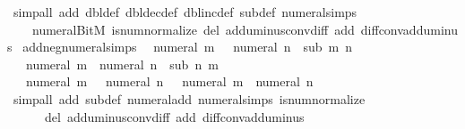 \begin{isabellebody}
\ {\isacharparenleft}{\kern0pt}simp{\isacharunderscore}{\kern0pt}all\ add{\isacharcolon}{\kern0pt}\ dbl{\isacharunderscore}{\kern0pt}def\ dbl{\isacharunderscore}{\kern0pt}dec{\isacharunderscore}{\kern0pt}def\ dbl{\isacharunderscore}{\kern0pt}inc{\isacharunderscore}{\kern0pt}def\ sub{\isacharunderscore}{\kern0pt}def\ numeral{\isachardot}{\kern0pt}simps\isanewline
\ \ \ \ numeral{\isacharunderscore}{\kern0pt}BitM\ is{\isacharunderscore}{\kern0pt}num{\isacharunderscore}{\kern0pt}normalize\ del{\isacharcolon}{\kern0pt}\ add{\isacharunderscore}{\kern0pt}uminus{\isacharunderscore}{\kern0pt}conv{\isacharunderscore}{\kern0pt}diff\ add{\isacharcolon}{\kern0pt}\ diff{\isacharunderscore}{\kern0pt}conv{\isacharunderscore}{\kern0pt}add{\isacharunderscore}{\kern0pt}uminus{\isacharparenright}{\kern0pt}%
\endisatagproof
{\isafoldproof}%
%
\isadelimproof
\isanewline
%
\endisadelimproof
\isanewline
{}\isamarkupfalse%
\ add{\isacharunderscore}{\kern0pt}neg{\isacharunderscore}{\kern0pt}numeral{\isacharunderscore}{\kern0pt}simps{\isacharcolon}{\kern0pt}\isanewline
\ \ {\isachardoublequoteopen}numeral\ m\ {\isacharplus}{\kern0pt}\ {\isacharminus}{\kern0pt}\ numeral\ n\ {\isacharequal}{\kern0pt}\ sub\ m\ n{\isachardoublequoteclose}\isanewline
\ \ {\isachardoublequoteopen}{\isacharminus}{\kern0pt}\ numeral\ m\ {\isacharplus}{\kern0pt}\ numeral\ n\ {\isacharequal}{\kern0pt}\ sub\ n\ m{\isachardoublequoteclose}\isanewline
\ \ {\isachardoublequoteopen}{\isacharminus}{\kern0pt}\ numeral\ m\ {\isacharplus}{\kern0pt}\ {\isacharminus}{\kern0pt}\ numeral\ n\ {\isacharequal}{\kern0pt}\ {\isacharminus}{\kern0pt}\ {\isacharparenleft}{\kern0pt}numeral\ m\ {\isacharplus}{\kern0pt}\ numeral\ n{\isacharparenright}{\kern0pt}{\isachardoublequoteclose}\isanewline
%
\isadelimproof
\ \ %
\endisadelimproof
%
\isatagproof
{}\isamarkupfalse%
\ {\isacharparenleft}{\kern0pt}simp{\isacharunderscore}{\kern0pt}all\ add{\isacharcolon}{\kern0pt}\ sub{\isacharunderscore}{\kern0pt}def\ numeral{\isacharunderscore}{\kern0pt}add\ numeral{\isachardot}{\kern0pt}simps\ is{\isacharunderscore}{\kern0pt}num{\isacharunderscore}{\kern0pt}normalize\isanewline
\ \ \ \ \ \ del{\isacharcolon}{\kern0pt}\ add{\isacharunderscore}{\kern0pt}uminus{\isacharunderscore}{\kern0pt}conv{\isacharunderscore}{\kern0pt}diff\ add{\isacharcolon}{\kern0pt}\ diff{\isacharunderscore}{\kern0pt}conv{\isacharunderscore}{\kern0pt}add{\isacharunderscore}{\kern0pt}uminus{\isacharparenright}{\kern0pt}%
\endisatagproof
{\isafoldproof}%
%
\isadelimproof
\isanewline
%
\endisadelimproof
\isanewline
{}\isamarkupfalse%

\end{isabellebody}
